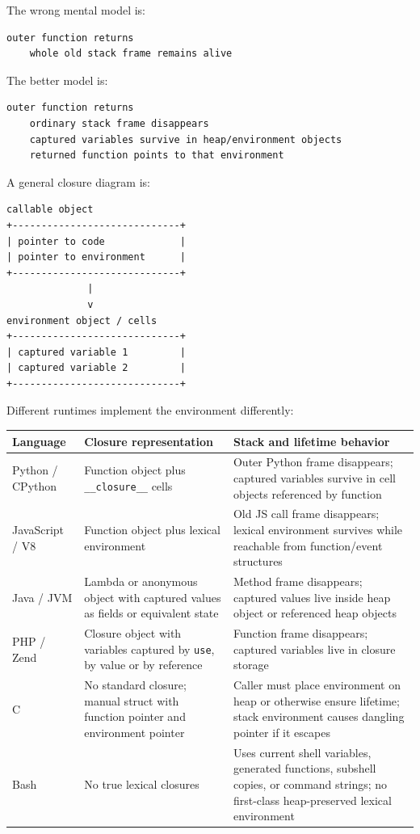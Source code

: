 \documentclass[a4paper,twoside]{report}
\begin{document}
The wrong mental model is:

\begin{verbatim}
outer function returns
    whole old stack frame remains alive
\end{verbatim}

The better model is:

\begin{verbatim}
outer function returns
    ordinary stack frame disappears
    captured variables survive in heap/environment objects
    returned function points to that environment
\end{verbatim}

A general closure diagram is:

\begin{verbatim}
callable object
+-----------------------------+
| pointer to code             |
| pointer to environment      |
+-----------------------------+
              |
              v
environment object / cells
+-----------------------------+
| captured variable 1         |
| captured variable 2         |
+-----------------------------+
\end{verbatim}

Different runtimes implement the environment differently:

\begin{center}
\begin{tabular}{|p{}|p{}|p{}|}
\hline
\textbf{Language} & \textbf{Closure representation} & \textbf{Stack and lifetime behavior} \\
\hline
Python / CPython & Function object plus \texttt{\_\_closure\_\_} cells & Outer Python frame disappears; captured variables survive in cell objects referenced by function \\
\hline
JavaScript / V8 & Function object plus lexical environment & Old JS call frame disappears; lexical environment survives while reachable from function/event structures \\
\hline
Java / JVM & Lambda or anonymous object with captured values as fields or equivalent state & Method frame disappears; captured values live inside heap object or referenced heap objects \\
\hline
PHP / Zend & Closure object with variables captured by \texttt{use}, by value or by reference & Function frame disappears; captured variables live in closure storage \\
\hline
C & No standard closure; manual struct with function pointer and environment pointer & Caller must place environment on heap or otherwise ensure lifetime; stack environment causes dangling pointer if it escapes \\
\hline
Bash & No true lexical closures & Uses current shell variables, generated functions, subshell copies, or command strings; no first-class heap-preserved lexical environment \\
\hline
\end{tabular}
\end{center}
\end{document}
